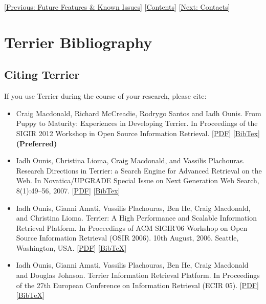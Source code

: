 {[}\href{todo.html}{Previous: Future Features \& Known Issues}{]}
{[}\href{index.html}{Contents}{]} {[}\href{contacts.html}{Next:
Contacts}{]}\\[2\baselineskip]

\section{Terrier Bibliography}\label{terrier-bibliography}

\subsection{Citing Terrier}\label{citing-terrier}

If you use Terrier during the course of your research, please cite:

\begin{itemize}
\tightlist
\item
  Craig Macdonald, Richard McCreadie, Rodrygo Santos and Iadh Ounis.
  From Puppy to Maturity: Experiences in Developing Terrier. In
  Proceedings of the SIGIR 2012 Workshop in Open Source Information
  Retrieval.
  {[}\href{http://terrierteam.dcs.gla.ac.uk/publications/macdonald12terrier.pdf}{PDF}{]}
  {[}\href{http://terrierteam.dcs.gla.ac.uk/publications/macdonald2012puppy.bib}{BibTex}{]}
  \textbf{(Preferred)}
\item
  Iadh Ounis, Christina Lioma, Craig Macdonald, and Vassilis Plachouras.
  Research Directions in Terrier: a Search Engine for Advanced Retrieval
  on the Web. In Novatica/UPGRADE Special Issue on Next Generation Web
  Search, 8(1):49--56, 2007.
  {[}\href{http://terrierteam.dcs.gla.ac.uk/publications/up8-1Ounis.pdf}{PDF}{]}
  {[}\href{http://terrier.org/publications/8380.bib}{BibTex}{]}
\item
  Iadh Ounis, Gianni Amati, Vassilis Plachouras, Ben He, Craig
  Macdonald, and Christina Lioma. Terrier: A High Performance and
  Scalable Information Retrieval Platform. In Proceedings of ACM
  SIGIR'06 Workshop on Open Source Information Retrieval (OSIR 2006).
  10th August, 2006. Seattle, Washington, USA.
  {[}\href{http://terrier.org/publications/ounis06terrier-osir.pdf}{PDF}{]}
  {[}\href{http://terrier.org/publications/ounis06terrier-osir.bib}{BibTeX}{]}
\item
  Iadh Ounis, Gianni Amati, Vassilis Plachouras, Ben He, Craig Macdonald
  and Douglas Johnson. Terrier Information Retrieval Platform. In
  Proceedings of the 27th European Conference on Information Retrieval
  (ECIR 05).
  {[}\href{http://terrier.org/publications/ounis05terrier.pdf}{PDF}{]}
  {[}\href{http://terrier.org/publications/ounis05terrier.bib}{BibTeX}{]}
\end{itemize}

